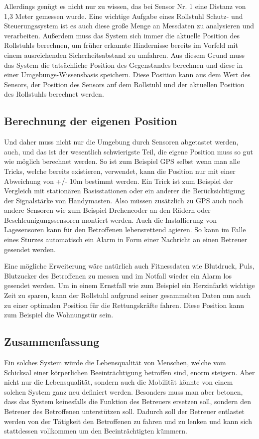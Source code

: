 Allerdings genügt es nicht nur zu wissen, das bei Sensor Nr. 1 eine Distanz von 1,3 Meter gemessen wurde.
Eine wichtige Aufgabe eines Rollstuhl Schutz- und Steuerungssystem ist es auch diese große Menge an Messdaten zu analysieren und verarbeiten.
Außerdem muss das System sich immer die aktuelle Position des Rollstuhls berechnen, um früher erkannte Hindernisse bereits im Vorfeld mit einem ausreichenden Sicherheitsabstand zu umfahren.
Aus diesem Grund muss das System die tatsächliche Position des Gegenstandes berechnen und diese in einer Umgebungs-Wissensbasis speichern.
Diese Position kann aus dem Wert des Sensors, der Position des Sensors auf dem Rollstuhl und der aktuellen Position des Rollstuhls berechnet werden.


\subsection{Berechnung der eigenen Position}
Und daher muss nicht nur die Umgebung durch Sensoren abgetastet werden, auch, und das ist der wesentlich schwierigste Teil, die eigene Position muss so gut wie möglich berechnet werden.
So ist zum Beispiel GPS selbst wenn man alle Tricks, welche bereits existieren, verwendet, kann die Position nur mit einer Abweichung von +/- 10m bestimmt werden.
Ein Trick ist zum Beispiel der Vergleich mit stationären Basisstationen oder ein anderer die Berücksichtigung der Signalstärke von Handymasten.
Also müssen zusätzlich zu GPS auch noch andere Sensoren wie zum Beispiel Drehencoder an den Rädern oder Beschleunigungssensoren montiert werden.
Auch die Installierung von Lagesensoren kann für den Betroffenen lebensrettend agieren.
So kann im Falle eines Sturzes automatisch ein Alarm in Form einer Nachricht an einen Betreuer gesendet werden.

Eine mögliche Erweiterung wäre natürlich auch Fitnessdaten wie Blutdruck, Puls, Blutzucker des Betroffenen zu messen und im Notfall wieder ein Alarm los gesendet werden.
Um in einem Ernstfall wie zum Beispiel ein Herzinfarkt wichtige Zeit zu sparen, kann der Rollstuhl aufgrund seiner gesammelten Daten nun auch zu einer optimalen Position für die Rettungskräfte fahren.
Diese Position kann zum Beispiel die Wohnungstür sein.


\subsection{Zusammenfassung}
Ein solches System würde die Lebensqualität von Menschen, welche vom Schicksal einer körperlichen Beeinträchtigung betroffen sind, enorm steigern.
Aber nicht nur die Lebensqualität, sondern auch die Mobilität könnte von einem solchen System ganz neu definiert werden.
Besonders muss man aber betonen, dass das System keinesfalls die Funktion des Betreuers ersetzen soll, sondern den Betreuer des Betroffenen unterstützen soll.
Dadurch soll der Betreuer entlastet werden von der Tätigkeit den Betroffenen zu fahren und zu lenken und kann sich stattdessen vollkommen um den Beeinträchtigten kümmern.


